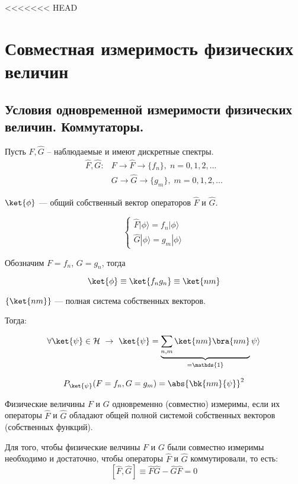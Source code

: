 <<<<<<< HEAD
\chapter{Совместная измеримость физических величин}

\section{Условия одновременной измеримости физических величин. Коммутаторы.}

Пусть $\widehat{F}, \widehat{G}$ -- наблюдаемые и имеют дискретные спектры.
$$
\begin{array}{lcl}
\widehat{F}, \widehat{G}:  & F \rightarrow \widehat{F} \rightarrow \{f_n\}, \; n=0,1,2,\dots\\
                           & G \rightarrow \widehat{G} \rightarrow \{g_m\}, \; m=0,1,2,\dots
\end{array}
$$

$\ket{\phi}$ --- общий собственный вектор операторов $\widehat{F}$ и $\widehat{G}$.

\begin{equation}
\label{eq:4_1_1}
\begin{cases}
\widehat{F} |\phi \rangle = f_n |\phi \rangle\\
\widehat{G} |\phi \rangle = g_m |\phi \rangle
\end{cases} 
\end{equation}

Обозначим $F = f_n$, $G=g_n$, тогда

$$\ket{\phi} \equiv \ket{f_n g_n} \equiv \ket{nm}$$

$\{\ket{nm}\}$ --- полная система собственных векторов.

Тогда:

\begin{equation}
\label{eq:4_1_2}
\forall \ket{\psi} \in \mathcal{H} ~\rightarrow ~ \ket{\psi} = \underbrace{\sum_{n,m}\ket{nm}\bra{nm}}_{=\mathds{1}} \psi \rangle 
\end{equation}

$$P_{\ket{\psi}}(F = f_n, G = g_m) = \abs{\bk{nm}{\psi}}^2$$

\begin{defn}
Физические величины $F$ и $G$ одновременно (совместно) измеримы, если их операторы $\widehat{F}$ и $\widehat{G}$ обладают общей полной системой собственных векторов (собственных функций).
\end{defn}

\begin{thm}\label{theorema_iv_chapter}
Для того, чтобы физические велчины $F$ и $G$ были совместно измеримы необходимо и достаточно, чтобы операторы $\widehat{F}$ и $\widehat{G}$ коммутировали, то есть: 
$$[\widehat{F}, \widehat{G}] \equiv \widehat{F}\widehat{G} - \widehat{G}\widehat{F} = 0$$
\end{thm}


